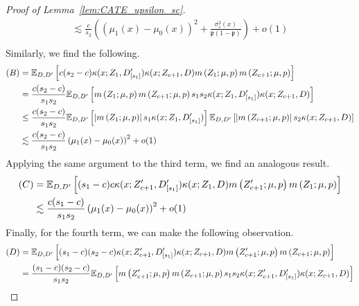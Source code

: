\begin{proof}[Proof of Lemma~\ref{lem:CATE_upsilon_sc}]
\begin{equation}
\begin{aligned}
			\lesssim \frac{c}{s_2} \left(\left(\mu_1(x) - \mu_0(x)\right)^2 + \frac{\sigma^2_{\varepsilon}(x)}{\mathfrak{p}(1 - \mathfrak{p})}\right) + o(1)\\
		\end{aligned}
	\end{equation}
	Similarly, we find the following.
	\begin{equation}
		\begin{aligned}
			(B)
			& = \mathbb{E}_{D, D^{\prime}}\left[c (s_2 - c) \kappa(x; Z_{1}, D_{[s_1]}^{\prime})\kappa(x; Z_{c+1}, D) m\left(Z_{1}; \mu, p\right) m\left(Z_{c+1}; \mu, p\right)\right]\\
			& = \frac{c (s_2 - c)}{s_1 s_2} \mathbb{E}_{D, D^{\prime}}\left[m\left(Z_{1}; \mu, p\right) m\left(Z_{c+1}; \mu, p\right) s_1 s_2 \kappa(x; Z_{1}, D_{[s_1]}^{\prime})\kappa(x; Z_{c+1}, D) \right]\\
			& \leq \frac{c (s_2 - c)}{s_1 s_2} \mathbb{E}_{D, D^{\prime}}\left[\left|m\left(Z_{1}; \mu, p\right)\right|  s_1 \kappa(x; Z_{1}, D_{[s_1]}^{\prime})\right]
			\mathbb{E}_{D, D^{\prime}}\left[\left| m\left(Z_{c+1}; \mu, p\right) \right| s_2 \kappa(x; Z_{c+1}, D) \right] \\
			& \lesssim \frac{c (s_2 - c)}{s_1 s_2} \left(\mu_1(x) - \mu_0(x)\right)^2 + o(1)
		\end{aligned}
	\end{equation}
	Applying the same argument to the third term, we find an analogous result.
	\begin{equation}
		\begin{aligned}
			(C)
			& = \mathbb{E}_{D, D^{\prime}}\left[(s_1 - c)c\kappa(x; Z_{c+1}^{\prime}, D_{[s_1]}^{\prime}) \kappa(x; Z_{1}, D) m\left(Z_{c+1}^{\prime}; \mu, p\right) m\left(Z_{1}; \mu, p\right)\right]\\
			& \lesssim  \frac{c (s_1 - c)}{s_1 s_2} \left(\mu_1(x) - \mu_0(x)\right)^2 + o(1)
		\end{aligned}
	\end{equation}
	Finally, for the fourth term, we can make the following observation.
	\begin{equation}
		\begin{aligned}
			(D)
			& = \E_{D, D^{\prime}}\left[(s_1 - c)(s_2 - c)\kappa(x; Z_{c+1}^{\prime}, D_{[s_1]}^{\prime}) \kappa(x; Z_{c+1}, D) m\left(Z_{c+1}^{\prime}; \mu, p\right) m\left(Z_{c+1}; \mu, p\right)\right]\\
			& = \frac{(s_1 - c)(s_2 - c)}{s_1 s_2}\E_{D, D^{\prime}}\left[m\left(Z_{c+1}^{\prime}; \mu, p\right) m\left(Z_{c+1}; \mu, p\right) s_1 s_2 \kappa(x; Z_{c+1}^{\prime}, D_{[s_1]}^{\prime}) \kappa(x; Z_{c+1}, D)\right]\\

\end{aligned}
\end{equation}
\end{proof}
